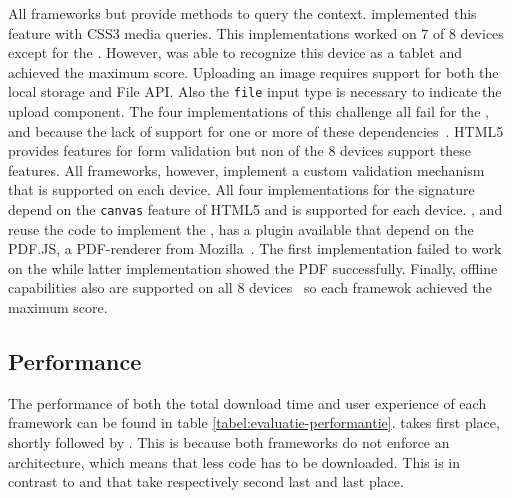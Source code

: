 \documentclass[a4paper]{artikel3}
\newcommand{\code}[1]{\texttt{#1}}
\begin{document}
All frameworks but \jqma{} provide methods to query the context.
\jqma{} implemented this feature with CSS3 media queries.
This implementations worked on $7$ of $8$ devices except for the \gtab.
However,  \kendob{} was able to recognize this device as a tablet and achieved the maximum score.
Uploading an image requires support for both the local storage and File API.  
Also the \code{file} input type is necessary to indicate the upload component.
The four implementations of this challenge all fail for the \htc{}, \gtab{} and \ipadi{} because the lack of support for one or more of these dependencies~\cite{Deveria2013c}.
HTML5 provides features for form validation but non of the $8$ devices support these features.
All frameworks, however,  implement a custom validation mechanism that is supported on each device.
All four implementations for the signature depend on the \code{canvas} feature of HTML5 and is supported for each device.
\kendob{}, \jqma{} and \lungo{} reuse the code to implement the , \sta{} has a plugin available that depend on the PDF.JS,  a PDF-renderer from Mozilla~\cite{Gal2010}.
The first implementation failed to work on the \gs{} while latter implementation showed the PDF successfully.
Finally, offline capabilities also are supported on all $8$ devices~\cite{Deveria2013c} so each framewok achieved the maximum score.

  

\subsection{Performance} %
\label{sec:evaluation-performance}
The performance of both the total download time and user experience of each framework can be found in table \ref{tabel:evaluatie-performantie}.
\jqma{} takes first place, shortly followed by \lungo{}.
This is because both frameworks do not enforce an architecture, which means that less \js{} code has to be downloaded.
This is in contrast to \kendob{} and \sta{} that take respectively second last and last place.
\end{document}
